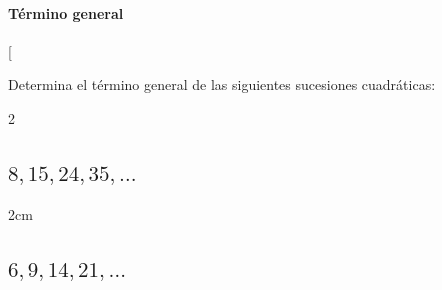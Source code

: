 \documentclass[12pt,addpoints,answers]{repaso}
\begin{document}
\begin{questions}




    \subsection{Término general}

    \ejemplosboxed[{Determina el término general de las siguientes sucesiones cuadráticas:

                \begin{multicols}{2}
                    \begin{parts}
                        \part {\large $8,15,24,35,\dots$}

                        \begin{solutionbox}{2cm}
                            \fillin[$n^2+4n+3$][0cm]
                        \end{solutionbox}

                        \part {\large $6,9,14,21, \dots$}


\end{parts}
\end{multicols}}
\end{questions}
\end{document}
